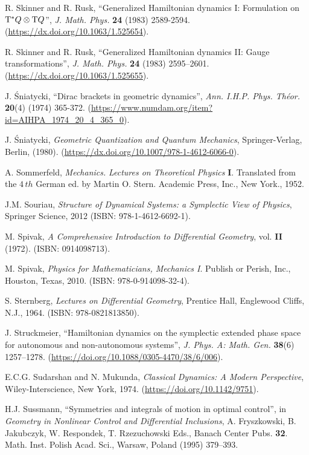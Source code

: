\documentclass[12pt]{report}
\def\Tan{{\rm T}}
\begin{document}
\begin{thebibliography}{999}
R. Skinner and R. Rusk,
``Generalized Hamiltonian dynamics I: Formulation on $\Tan^*Q\otimes\Tan Q$'',
{\sl J. Math. Phys.} {\bf 24}  (1983) 2589-2594.
(\url{https://dx.doi.org/10.1063/1.525654}).

R. Skinner and R. Rusk,
``Generalized Hamiltonian dynamics II: Gauge transformations'',
{\sl J. Math. Phys.} {\bf 24}  (1983) 2595--2601.
(\url{https://dx.doi.org/10.1063/1.525655}).

J. \'Sniatycki,
``Dirac brackets in geometric dynamics'',
{\sl Ann. I.H.P. Phys. Th\' eor.}  {\bf 20}(4) (1974) 365-372.
(\url{https://www.numdam.org/item?id=AIHPA_1974_20_4_365_0}).

J. \'Sniatycki,
{\it Geometric Quantization and Quantum Mechanics\/},
Springer-Verlag, Berlin, (1980).
(\url{https://dx.doi.org/10.1007/978-1-4612-6066-0}).

A. Sommerfeld, 
{\it Mechanics.} 
{\sl Lectures on Theoretical Physics} {\bf I}. 
Translated from the $4\,th$ German ed. by Martin O. Stern. Academic Press, Inc., New York., 1952. %

J.M. Souriau,
{\it Structure of Dynamical Systems: a Symplectic View of Physics\/},
Springer Science, 2012
(ISBN: 978-1-4612-6692-1).

M. Spivak, {\it A Comprehensive Introduction to
Differential Geometry}, {\rm vol.} {\bf II} (1972). (ISBN: 0914098713).

M. Spivak,
{\it Physics for Mathematicians, Mechanics I}. Publish or Perish, Inc., Houston, Texas, 2010.%
(ISBN: 978-0-914098-32-4).

S. Sternberg, {\it Lectures on Differential Geometry}, Prentice Hall, Englewood Cliffs, N.J., 1964.
(ISBN: 978-0821813850).

J. Struckmeier,
``Hamiltonian dynamics on the symplectic extended phase space for autonomous and non-autonomous systems'',
{\sl J. Phys. A: Math. Gen.} {\bf 38}(6) 1257--1278.
(\url{https://doi.org/10.1088/0305-4470/38/6/006}).

E.C.G. Sudarshan and N. Mukunda, 
{\it Classical Dynamics: A Modern Perspective},
 Wiley-Interscience, New York, 1974.
(\url{https://doi.org/10.1142/9751}).

H.J. Sussmann, 
``Symmetries and integrals of motion in optimal control'',
 in {\sl Geometry in Nonlinear Control and
Differential Inclusions}, A. Fryszkowski, B. Jakubczyk, W. Respondek, T. Rzezuchowski Eds., Banach Center Pubs. {\bf 32}.
Math. Inst. Polish Acad. Sci., Warsaw, Poland (1995) 379--393.


\end{thebibliography}
\end{document}
